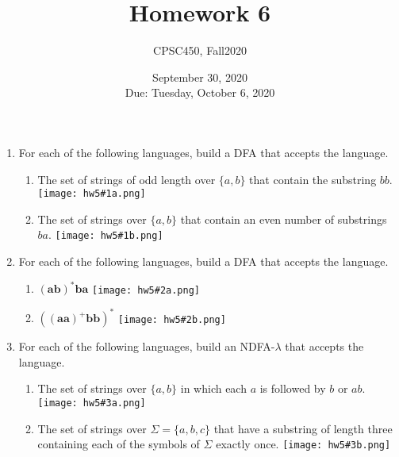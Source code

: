\documentclass{article}
\title{Homework 6}
\author{CPSC450, Fall2020}
\date{September 30, 2020\\
Due: Tuesday, October 6, 2020}
\begin{document}
\maketitle

\begin{enumerate}

\item For each of the following languages, build a DFA that accepts
  the language.
  \begin{enumerate}
    \item The set of strings of odd length over $\{a, b\}$ that
      contain the substring $bb$.
      \newline \texttt{[image: hw5\#1a.png]}

    \item The set of strings over $\{a, b\}$ that contain an even
      number of substrings $ba$.
      \newline \texttt{[image: hw5\#1b.png]}
  \end{enumerate}

\item For each of the following languages, build a DFA that accepts
  the language.
  \begin{enumerate}
  \item $\mathbf{(ab)^*ba}$
  \newline \texttt{[image: hw5\#2a.png]}
  \item $\mathbf{((aa)^+bb)^*}$
  \newline \texttt{[image: hw5\#2b.png]}
  \end{enumerate}
  
\item For each of the following languages, build an NDFA-$\lambda$
  that accepts the language.
  \begin{enumerate}
    \item The set of strings over $\{a, b\}$ in which each $a$ is
      followed by $b$ or $ab$.
        \newline \texttt{[image: hw5\#3a.png]}
    \item The set of strings over $\Sigma = \{a, b, c\}$ that have a
      substring of length three containing each of the symbols of
      $\Sigma$ exactly once.
      \newline \texttt{[image: hw5\#3b.png]}

  \end{enumerate}

\end{enumerate}  
     
\end{document}
